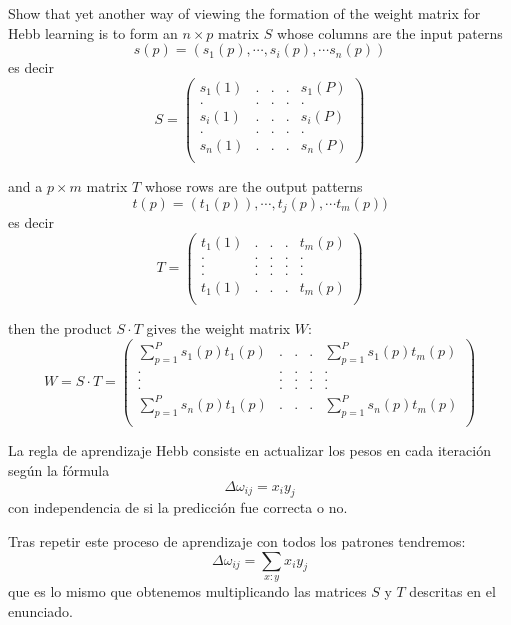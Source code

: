 \begin{problem}[1]\label{ej:3_1}
Show that yet another way of viewing the formation of the weight matrix for Hebb learning is to form an $n\times p$ matrix $S$ whose columns are the input paterns
\[s(p) = (s_1(p),\cdots, s_i(p),\cdots s_n(p))\]
es decir
\[S = \left( \begin{array}{ccccc}
s_1(1) & . & . & . & s_1(P) \\
. & . & . & . & . \\
s_i(1) & . & . & . & s_i(P) \\
. & . & . & . & . \\
s_n(1) & . & . & . & s_n(P) \\
\end{array}\right)\]

and a $p \times m$ matrix $T$ whose rows are the output patterns
\[t(p) = (t_1(p)), \cdots, t_j(p), \cdots t_m(p))\]
es decir
\[T = \left( \begin{array}{ccccc}
t_1(1) & . & . & . & t_m(p) \\
. & . & . & . & . \\
. & . & . & . & . \\
. & . & . & . & . \\
t_1(1) & . & . & . & t_m(p) \\
\end{array}\right)\]

then the product $S\cdot T$ gives the weight matrix $W$:
\[W = S\cdot T =  \left( \begin{array}{ccccc}
\sum_{p=1}^P s_1(p)t_1(p) & . & . & . & \sum_{p=1}^P s_1(p)t_m(p) \\
. & . & . & . & . \\
. & . & . & . & . \\
. & . & . & . & . \\
\sum_{p=1}^P s_n(p)t_1(p) & . & . & . & \sum_{p=1}^P s_n(p)t_m(p) \\
\end{array}\right)\]
\solution


La regla de aprendizaje Hebb consiste en actualizar los pesos en cada iteración según la fórmula
\[Δω_{ij} = x_iy_j\]
con independencia de si la predicción fue correcta o no.

Tras repetir este proceso de aprendizaje con todos los patrones tendremos:
\[Δω_{ij} = \sum_{x:y} x_iy_j\]
que es lo mismo que obtenemos multiplicando las matrices $S$ y $T$ descritas en el enunciado.

\end{problem}

